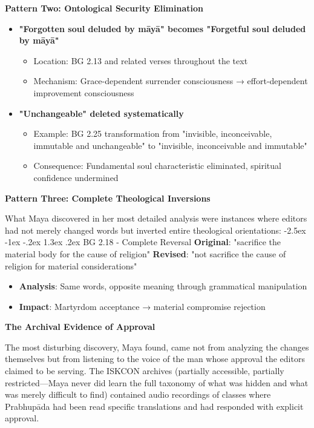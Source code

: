 \documentclass[12pt,twoside]{book}
\makeatletter
\renewcommand\section{\@startsection{section}{1}{\z@}%
{-2.5ex \@plus -1ex \@minus -.2ex}%
{1.3ex \@plus.2ex}%
{\normalfont\Large\bfseries}}
\makeatother
\begin{document}
\textbf{\textbf{Pattern Two: Ontological Security Elimination}}  
\begin{itemize}
\item \textbf{\textbf{"Forgotten soul deluded by māyā" becomes "Forgetful soul deluded by māyā"}}
\begin{itemize}
\item Location: BG 2.13 and related verses throughout the text
\item Mechanism: Grace-dependent surrender consciousness → effort-dependent improvement consciousness
\end{itemize}

\item \textbf{\textbf{"Unchangeable" deleted systematically}}
\begin{itemize}
\item Example: BG 2.25 transformation from "invisible, inconceivable, immutable and unchangeable" to "invisible, inconceivable and immutable"
\item Consequence: Fundamental soul characteristic eliminated, spiritual confidence undermined
\end{itemize}
\end{itemize}

\textbf{\textbf{Pattern Three: Complete Theological Inversions}}

What Maya discovered in her most detailed analysis were instances where editors had not merely changed words but inverted entire theological orientations:
\section{BG 2.18 - Complete Reversal}
\label{sec:org841df93}
\textbf{\textbf{Original}}: "sacrifice the material body for the cause of religion" 
\textbf{\textbf{Revised}}: "not sacrifice the cause of religion for material considerations"
\begin{itemize}
\item \textbf{\textbf{Analysis}}: Same words, opposite meaning through grammatical manipulation
\item \textbf{\textbf{Impact}}: Martyrdom acceptance → material compromise rejection
\end{itemize}

\textbf{\textbf{The Archival Evidence of Approval}}

The most disturbing discovery, Maya found, came not from analyzing the changes themselves but from listening to the voice of the man whose approval the editors claimed to be serving. The ISKCON archives (partially accessible, partially restricted—Maya never did learn the full taxonomy of what was hidden and what was merely difficult to find) contained audio recordings of classes where Prabhupāda had been read specific translations and had responded with explicit approval.
\end{document}

